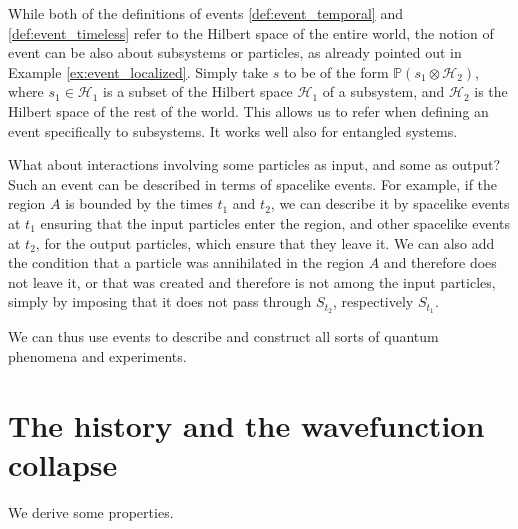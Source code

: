 \documentclass[11pt]{amsart}
\theoremstyle{definition}
\theoremstyle{plain}
\begin{document}
While both of the definitions of events \ref{def:event_temporal} and \ref{def:event_timeless} refer to the Hilbert space of the entire world, the notion of event can be also about subsystems or particles, as already pointed out in Example \ref{ex:event_localized}. Simply take $s$ to be of the form $\mathbb P( s_1\otimes\mathcal{H}_2)$, where $s_1\in\mathcal{H}_1$ is a subset of the Hilbert space $\mathcal{H}_1$ of a subsystem, and $\mathcal{H}_2$ is the Hilbert space of the rest of the world. This allows us to refer when defining an event specifically to subsystems. It works well also for entangled systems.

What about interactions involving some particles as input, and some as output? Such an event can be described in terms of spacelike events. For example, if the region $A$ is bounded by the times $t_1$ and $t_2$, we can describe it by spacelike events at $t_1$ ensuring that the input particles enter the region, and other spacelike events at $t_2$, for the output particles, which ensure that they leave it. We can also add the condition that a particle was annihilated in the region $A$ and therefore does not leave it, or that was created and therefore is not among the input particles, simply by imposing that it does not pass through $S_{t_2}$, respectively $S_{t_1}$.

We can thus use events to describe and construct all sorts of quantum phenomena and experiments. 


\section{The history and the wavefunction collapse}
\label{s:history_collapse}

We derive some properties.
\end{document}
